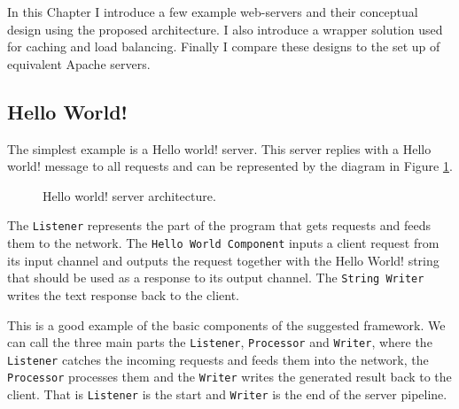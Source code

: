 \documentclass[12pt,a4paper]{article}
\begin{document}
In this Chapter I introduce a few example web-servers and their conceptual
design using the proposed architecture. I also introduce a wrapper 
solution used for caching and load balancing.
Finally I compare these designs to the set up of equivalent Apache servers.

\subsection{Hello World!}
\label{sec:helloWorld}
The simplest example is a Hello world! server. This server replies with a 
Hello world! message to all requests and can be represented by the diagram
in Figure \ref{fig:helloWorld}.

\begin{figure}[h]
\centering
{}
\caption[scale=1.0]{Hello world! server architecture.}
\label{fig:helloWorld}
\end{figure}

The \texttt{Listener} represents the 
part of the program that gets requests and feeds them to the network.
The \texttt{Hello World Component} inputs a client request from its input channel
and outputs the request together with the Hello World! string that should be 
used as a response to its output channel.
The \texttt{String Writer} writes the text response back to the client.

This is a good example of the basic components of the suggested framework.
We can call the three main parts the \texttt{Listener}, \texttt{Processor} 
and \texttt{Writer}, where
the \texttt{Listener} catches the incoming requests and feeds them into the network,
the \texttt{Processor} processes them and the \texttt{Writer} writes the generated result 
back to the client. That is \texttt{Listener} is the start and \texttt{Writer}
is the end of the server pipeline.
\end{document}
